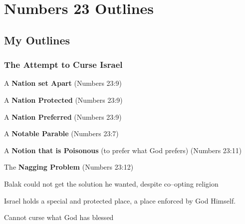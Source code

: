 \section{Numbers 23 Outlines}

\subsection{My Outlines}

\subsubsection{The Attempt to Curse Israel}
\begin{compactenum}[I.][8]
    \item A \textbf{Nation set Apart}  (Numbers 23:9)
    \item A \textbf{Nation Protected}  (Numbers 23:9)
    \item A \textbf{Nation Preferred}  (Numbers 23:9)
    \item A \textbf{Notable Parable}  (Numbers 23:7)
    \item A \textbf{Notion that is Poisonous} (to prefer what God prefers)  (Numbers 23:11)
    \item The \textbf{Nagging Problem}  (Numbers 23:12)
    \begin{compactenum}[A.][8]
    	\item Balak could not get the solution he wanted, despite co--opting religion
        \item Israel holds a special and protected place, a place enforced by God Himself.
        \item Cannot curse what God has blessed
    \end{compactenum}
\end{compactenum}

